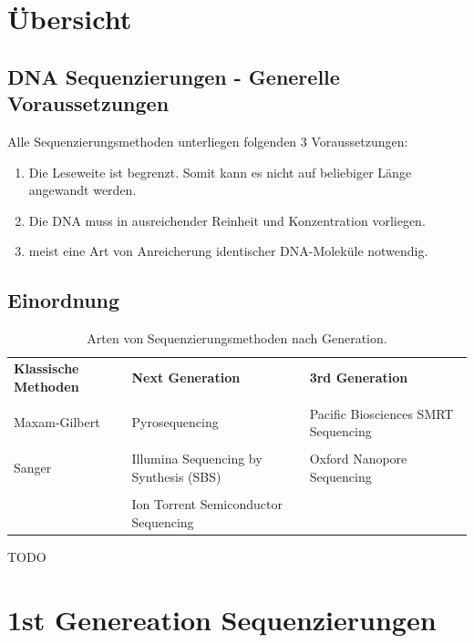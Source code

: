 
\section{Übersicht}
\subsection{DNA Sequenzierungen - Generelle Voraussetzungen}

Alle Sequenzierungsmethoden unterliegen folgenden 3 Voraussetzungen: 

\begin{enumerate}
    \item Die \gls{Leseweite} ist begrenzt. Somit kann es nicht auf beliebiger Länge angewandt werden.
    \item Die DNA muss in ausreichender Reinheit und Konzentration vorliegen.
    \item meist eine Art von Anreicherung identischer DNA-Moleküle notwendig.
\end{enumerate}

\subsection{Einordnung}
\begin{table}[H]
    \centering
    \begin{tabular}{p{4cm}|p{5cm}|p{5cm}}
        \textbf{Klassische Methoden} & \textbf{Next Generation} & \textbf{3rd Generation}  \\ && \\
        Maxam-Gilbert &  Pyrosequencing & Pacific Biosciences SMRT Sequencing \\ && \\
        Sanger &  Illumina Sequencing by Synthesis (SBS) & Oxford Nanopore Sequencing \\ && \\
        & Ion Torrent Semiconductor Sequencing &
    \end{tabular}
    \caption{Arten von Sequenzierungsmethoden nach Generation.}
    \label{tab:seq-gen}
\end{table}

\begin{mybox}[title=Wie unterscheiden sich die Generationen?]
TODO
\end{mybox}

\section{1st Genereation Sequenzierungen}

